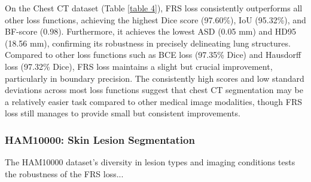 \documentclass[review]{elsarticle}
\begin{document}
On the Chest CT dataset (Table \ref{table 4}), FRS loss consistently outperforms all other loss functions, achieving the highest Dice score (97.60\%), IoU (95.32\%), and BF-score (0.98). Furthermore, it achieves the lowest ASD (0.05 mm) and HD95 (18.56 mm), confirming its robustness in precisely delineating lung structures. Compared to other loss functions such as BCE loss (97.35\% Dice) and Hausdorff loss (97.32\% Dice), FRS loss maintains a slight but crucial improvement, particularly in boundary precision. The consistently high scores and low standard deviations across most loss functions suggest that chest CT segmentation may be a relatively easier task compared to other medical image modalities, though FRS loss still manages to provide small but consistent improvements.

\subsubsection{HAM10000: Skin Lesion Segmentation}
The HAM10000 dataset's diversity in lesion types and imaging conditions tests the robustness of the FRS loss...
\end{document}
